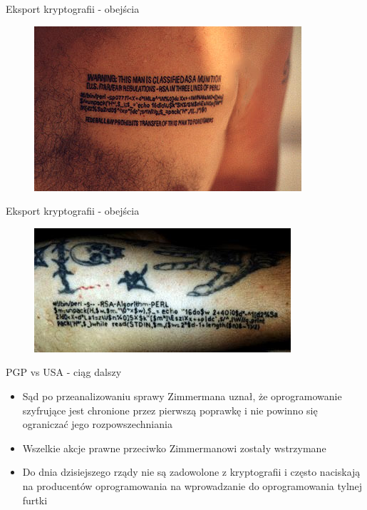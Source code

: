 \documentclass[aspectratio=169]{beamer}
\begin{document}
\begin{frame}{Eksport kryptografii - obejścia}
    \begin{figure}
        \centering
        \includegraphics[width=0.75\linewidth]{rsa2.jpg}
    \end{figure}
\end{frame}

\begin{frame}{Eksport kryptografii - obejścia}
    \begin{figure}
        \centering
        \includegraphics[width=0.8\linewidth]{rsa3.jpg}
    \end{figure}
\end{frame}

\begin{frame}{PGP vs USA - ciąg dalszy}
    \begin{itemize}
        \item Sąd po przeanalizowaniu sprawy Zimmermana uznał, że oprogramowanie szyfrujące jest chronione przez pierwszą poprawkę i nie powinno się ograniczać jego rozpowszechniania
        \item Wszelkie akcje prawne przeciwko Zimmermanowi zostały wstrzymane
        \item Do dnia dzisiejszego rządy nie są zadowolone z kryptografii i często naciskają na producentów oprogramowania na wprowadzanie do oprogramowania tylnej furtki
    \end{itemize}
\end{frame}
\end{document}
